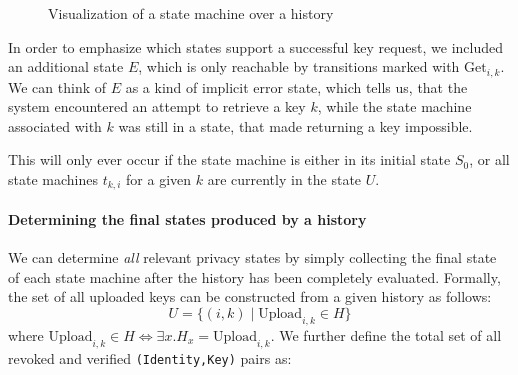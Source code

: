 \begin{figure}[h]
    \centering
    \caption{Visualization of a state machine over a history}
\end{figure}

In order to emphasize which states support a successful key request, we included an additional state \(E\), which is only reachable by transitions marked with \(\text{Get}_{i,k}\). We can think of \(E\) as a kind of implicit error state, which tells us, that the system encountered an attempt to retrieve a key \(k\), while the state machine associated with \(k\) was still in a state, that made returning a key impossible. 

This will only ever occur if the state machine is either in its initial state \(S_0\), or all state machines \(t_{k,i}\) for a given \(k\) are currently in the state \(U\).

\paragraph{Determining the final states produced by a history}
We can determine \emph{all} relevant privacy states by simply collecting the final state of each state machine after the history has been completely evaluated.
Formally, the set of all uploaded keys can be constructed from a given history as follows:
\newcommand{\pctext}[2]{\text{\parbox{#1}{\centering #2}}}
\[U = \biggl \{(i,k) \;\bigg|\; \text{Upload}_{i,k} \in H \biggr\}\]
where \(\text{Upload}_{i,k} \in H \Leftrightarrow \exists x. H_x = \text{Upload}_{i,k}\). 
We further define the total set of all revoked and verified \texttt{(Identity,Key)} pairs as:

